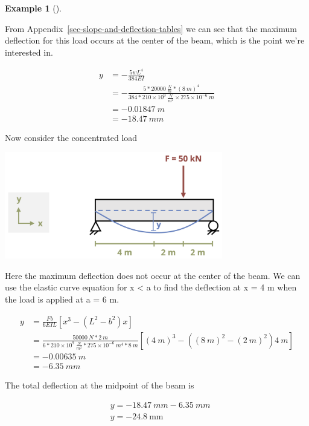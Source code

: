\documentclass[
  letterpaper,
  DIV=11,
  numbers=noendperiod]{scrreprt}
\theoremstyle{definition}
\newtheorem{example}{Example}[chapter]
\theoremstyle{remark}
\begin{document}
\begin{tcolorbox}
\begin{example}[]
\begin{tcolorbox}
From Appendix~\ref{sec-slope-and-deflection-tables} we can see that the
maximum deflection for this load occurs at the center of the beam, which
is the point we're interested in.

\[
\begin{aligned}
y&=-\frac{5 w L^4}{384EI} \\
&=-\frac{5*20000~\frac{N}{m}*(8{~m})^4}{384*210 \times 10^9~\frac{N}{m^2} \times 275 \times 10^{-6}{~m}} \\
& =-0.01847{~m} \\ 
& =-18.47{~mm}\end{aligned}
\]

Now consider the concentrated load

\begin{center}
\includegraphics[width=3.75in,height=\textheight]{images/CH11 PNGs/example11.5 copy 2.png}
\end{center}

Here the maximum deflection does not occur at the center of the beam. We
can use the elastic curve equation for x \textless{} a to find the
deflection at x = 4 m when the load is applied at a = 6 m.

\[
\begin{aligned}
y&=\frac{Fb}{6EIL}\left[x^3-\left(L^2-b^2\right) x\right]\\
&=\frac{50000{~N}*2{~m}}{6*210 \times 10^9~\frac{N}{m^2}*275 \times 10^{-6}{~m^4}* 8{~m}}\left[(4{~m})^3-\left((8{~m})^2-(2{~m})^2\right) 4{~m}\right] \\
& =-0.00635{~m} \\
& =-6.35{~mm}
\end{aligned}
\]

The total deflection at the midpoint of the beam is

\[
\begin{aligned} & y=-18.47{~mm}-6.35{~mm} \\ & y=-24.8 \mathrm{~mm}\end{aligned}
\]

\end{tcolorbox}

\end{example}

\end{tcolorbox}
\end{document}
